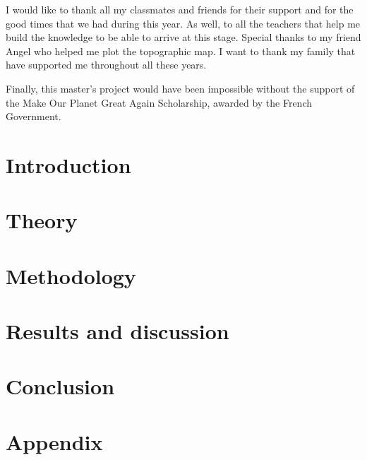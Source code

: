 \documentclass[english, a4paper, 12pt, twoside]{report}
\begin{document}
I would like to thank all my classmates and friends for their support and for the good times that we had during this year. As well, to all the teachers that help me build the knowledge to be able to arrive at this stage. Special thanks to my friend Angel who helped me plot the topographic map. I want to thank my family that have supported me throughout all these years.

Finally, this master's project would have been impossible without the support of the Make Our Planet Great Again Scholarship, awarded by the French Government.

\newpage

\tableofcontents
\linespread{1}
\listoffigures
\linespread{1.25}
\newpage
{}

\chapter{Introduction}


\chapter{Theory}


\chapter{Methodology} \label{sec:methodology}


\chapter{Results and discussion}


\chapter{Conclusion}


\clearpage



\appendix
\chapter{Appendix}

\end{document}
